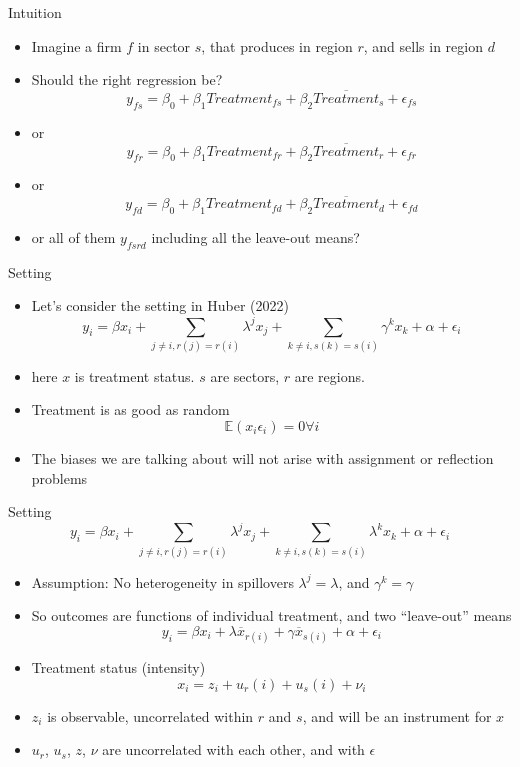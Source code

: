 \documentclass[english,xcolor=svgnames]{beamer}
\begin{document}
\begin{frame}{Intuition}
\begin{itemize}
\item Imagine a firm $f$ in sector $s$, that produces in region $r$, and sells in region $d$
\item Should the right regression be?
$$y_{fs} = \beta_0 + \beta_1 Treatment_{fs} + \beta_2 \overline{Treatment}_s + \epsilon_{fs}$$
\item or
$$y_{fr} = \beta_0 + \beta_1 Treatment_{fr} + \beta_2 \overline{Treatment}_r + \epsilon_{fr}$$
\item or
$$y_{fd} = \beta_0 + \beta_1 Treatment_{fd} + \beta_2 \overline{Treatment}_d + \epsilon_{fd}$$
\item or all of them $y_{fsrd}$ including all the leave-out means?
\end{itemize}
\end{frame}


\begin{frame}{Setting}
\begin{itemize}
\item Let's consider the setting in Huber (2022)
\[y_i  = \beta	x_i  + \sum_{j\neq i, r(j) = r(i)} \lambda^j x_j + \sum_{ k \neq i, s(k) = s(i)} \gamma^k x_k + \alpha + \epsilon_i\] 
\item here $x$ is treatment status. $s$ are sectors, $r$ are regions.
\item Treatment is as good as random
$$\mathbb{E}(x_i \epsilon_i) = 0 \forall i$$
\item The biases we are talking about will not arise with assignment or reflection problems
\end{itemize}
\end{frame}


\begin{frame}{Setting}
\[y_i  = \beta	x_i  + \sum_{j\neq i, r(j) = r(i)} \lambda^j x_j + \sum_{ k \neq i, s(k) = s(i)} \lambda^k x_k + \alpha + \epsilon_i\] 
\begin{itemize}
\item Assumption: No heterogeneity in spillovers $\lambda^j = \lambda$, and $\gamma^k = \gamma$
\item So outcomes are functions of individual treatment, and two ``leave-out'' means
\[y_i  = \beta	x_i  +  \lambda \overline{x}_{r(i)} + \gamma \overline{x}_{s(i)}  + \alpha + \epsilon_i\] 
\item Treatment status (intensity)
\[x_i = z_i + u_r(i) + u_s(i) + \nu_i \]
\item $z_i$ is observable, uncorrelated within $r$ and $s$, and will be an instrument for $x$
\item $u_r$, $u_s$, $z$, $\nu$ are uncorrelated with each other, and with $\epsilon$
\end{itemize}
\end{frame}
\end{document}
